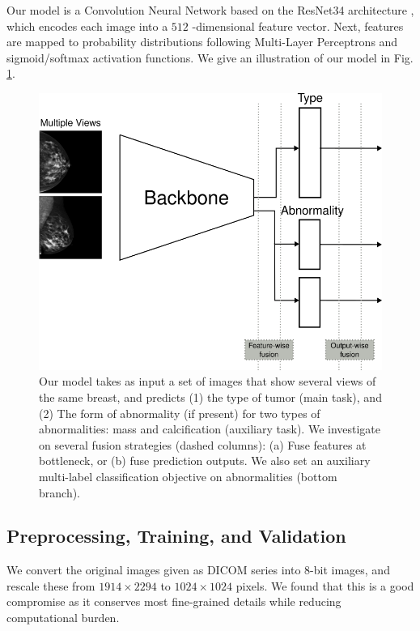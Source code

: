 \documentclass[11pt]{article}
\begin{document}
Our model is a Convolution Neural Network based on the ResNet34
architecture \autocite{he15}, which encodes each image into a \(512\) -dimensional feature
vector.
Next, features are mapped to probability distributions following Multi-Layer Perceptrons
and sigmoid/softmax activation functions.
We give an illustration of our model in Fig. \ref{fig:model}.

\begin{figure}[htbp]
\centering
\includegraphics[width=.9\linewidth]{./images/model.png}
\caption{\label{fig:model}Our model takes as input a set of images that show several views of the same breast, and predicts (1) the type of tumor (main task), and (2) The form of abnormality (if present) for two types of abnormalities: mass and calcification (auxiliary task). We investigate on several fusion strategies (dashed columns): (a) Fuse features at bottleneck, or (b) fuse prediction outputs. We also set an auxiliary multi-label classification objective on abnormalities (bottom branch).}
\end{figure}

\subsection{Preprocessing, Training, and Validation}
\label{sec:org619eab6}

We convert the original images given as DICOM series into 8-bit images,
and rescale these from \(1914 \times 2294\) to \(1024 \times 1024\) pixels. We found that this
is a good compromise as it conserves most fine-grained details while
reducing computational burden.
\end{document}
